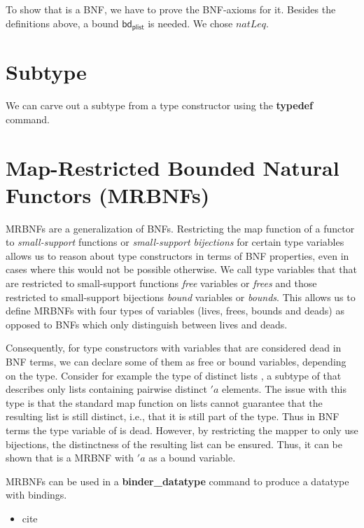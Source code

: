       To show that  is a \ac{BNF}, we have to prove the \ac{BNF}-axioms for it. Besides the definitions above, a bound $\textsf{bd}_\textsf{plist}$ is needed. We chose $natLeq$. 
      

  \section{Subtype}
    We can carve out a subtype from a type constructor using the \textbf{typedef} command. 

  \section{Map-Restricted Bounded Natural Functors (MRBNFs)}
    \acp{MRBNF} are a generalization of \acp{BNF}. Restricting the map function of a functor to \textit{small-support} functions or \textit{small-support bijections} for certain type variables allows us to reason about type constructors in terms of \ac{BNF} properties, even in cases where this would not be possible otherwise. We call type variables that that are restricted to small-support functions \textit{free} variables or \textit{frees} and those restricted to small-support bijections \textit{bound} variables or \textit{bounds}. This allows us to define \acp{MRBNF} with four types of variables (lives, frees, bounds and deads) as opposed to \acp{BNF} which only distinguish between lives and deads. 
    
    Consequently, for type constructors with variables that are considered dead in \ac{BNF} terms, we can declare some of them as free or bound variables, depending on the type. Consider for example the type of distinct lists , a subtype of  that describes only lists containing pairwise distinct $'a$ elements. The issue with this type is that the standard map function on lists cannot guarantee that the resulting list is still distinct, i.e., that it is still part of the type. Thus in \ac{BNF} terms the type variable of  is dead. However, by restricting the mapper to only use bijections, the distinctness of the resulting list can be ensured. Thus, it can be shown that  is a \ac{MRBNF} with $'a$ as a bound variable.


    \acp{MRBNF} can be used in a \textbf{binder\_datatype} command to produce a datatype with bindings. 
    
    
  \begin{itemize}
    \item cite \cite{blanchette2019bindings}
  \end{itemize}

